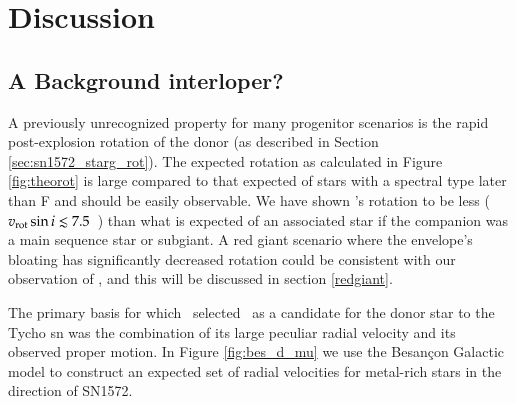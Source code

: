\section{Discussion}


\subsection{A Background interloper?}
\label{sec:sn1572:interloper}
A previously unrecognized property for many progenitor scenarios is the rapid post-explosion rotation of the donor (as described in Section \ref{sec:sn1572_starg_rot}).
The expected rotation as calculated in Figure \ref{fig:theorot} is
large compared to that expected of stars with a spectral type later
than F and should be easily observable. We have shown \starg's rotation to be less ($v_{\rm rot} \sin{i} \lesssim 7.5 $~\kms) than what is expected  of an associated star if the companion was a main sequence star or subgiant. A red giant scenario where the envelope's bloating has significantly decreased rotation could be consistent with our observation of \starg, and this will be discussed in section \ref{redgiant}.

The primary basis for which \rl\ selected \starg\ as a candidate for
the donor star to the Tycho \gls*{sn} was the combination of its large peculiar radial velocity
and its observed proper motion. In Figure \ref{fig:bes_d_mu} we
use the Besan\c{c}on Galactic model \citep{2003A&A...409..523R} to
construct an expected set of radial velocities for metal-rich stars in the
direction of SN1572.

